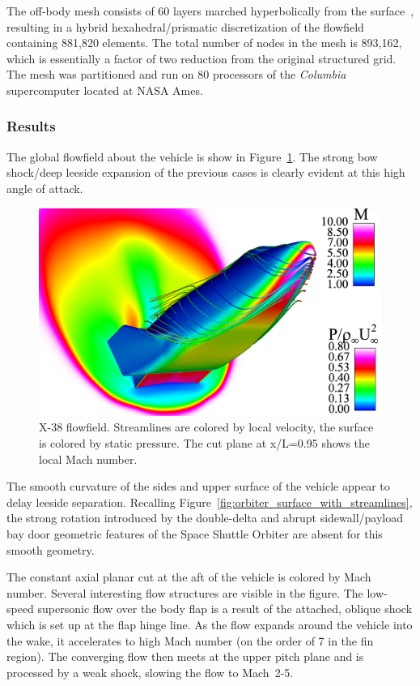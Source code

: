 The off-body mesh consists of 60 layers marched hyperbolically from the surface~\cite{gridgen}, resulting in a hybrid hexahedral/prismatic discretization of the flowfield containing 881,820 elements.  The total number of nodes in the mesh is 893,162, which is essentially a factor of two reduction from the original structured grid.  The mesh was partitioned and run on 80 processors of the \emph{Columbia} supercomputer located at NASA Ames.


\clearpage
\subsubsection{Results}
The global flowfield about the vehicle is show in Figure~\ref{fig:x38_flow}. The strong bow shock/deep leeside expansion of the previous cases is clearly evident at this high angle of attack.
\begin{figure}[hbtp]
  \begin{center}
    \includegraphics[width=\textwidth]{figures/x38/x38-pressure-mach-clip}
    \caption[X-38 flowfield.]{X-38 flowfield. Streamlines are colored by local velocity, the surface is colored by static pressure. The cut plane at x/L=0.95 shows the local Mach number.\label{fig:x38_flow}}
  \end{center}
\end{figure}
The smooth curvature of the  sides and  upper surface of the vehicle appear to delay leeside separation.  Recalling Figure~\ref{fig:orbiter_surface_with_streamlines}, the strong rotation introduced by the double-delta and abrupt sidewall/payload bay door geometric features of the Space Shuttle Orbiter are absent for this smooth geometry.

The constant axial planar cut at the aft of the vehicle is colored by Mach number.  Several interesting flow structures are visible in the figure.  The low-speed supersonic flow over the body flap is a result of the attached, oblique shock which is set up at the flap hinge line.  As the flow expands around the vehicle into the wake, it accelerates to high Mach number (on the order of 7 in the fin region). The converging flow then meets at the upper pitch plane and is processed by a weak shock, slowing the flow to Mach~2-5. 

